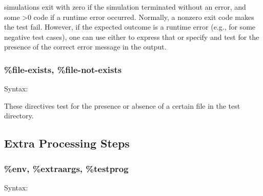 {\opp} simulations exit with zero if the simulation terminated
without an error, and some >0 code if a runtime error occurred. Normally,
a nonzero exit code makes the test fail. However, if the expected outcome
is a runtime error (e.g., for some negative test cases), one can use either
 to express that or specify 
and test for the presence of the correct error message in the output.



\subsubsection{\%file-exists, \%file-not-exists}
\label{sec:testing:opptest:file-exists}

Syntax:

\begin{filelisting}
\end{filelisting}

\begin{filelisting}
\end{filelisting}

These directives test for the presence or absence of a certain file in
the test directory.

\subsection{Extra Processing Steps}
\label{sec:testing:opptest:extra-processing-steps}

\subsubsection{\%env, \%extraargs, \%testprog}
\label{sec:testing:opptest:env-extraargs-testprog}

Syntax:

\begin{filelisting}
\end{filelisting}

\begin{filelisting}
\end{filelisting}

\begin{filelisting}
\end{filelisting}

